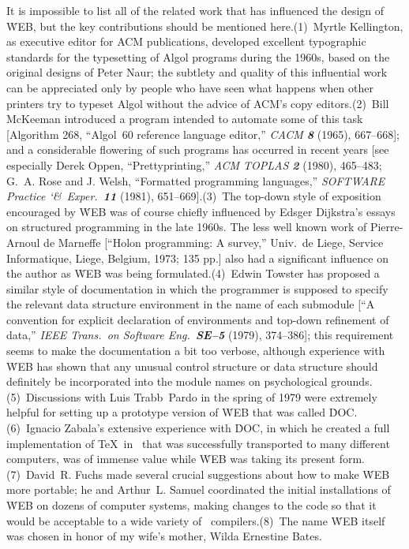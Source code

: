 It is impossible to list all of the related work that has influenced the
design of \.{WEB}, but the key contributions should be mentioned
here.\quad (1)~Myrtle Kellington, as executive editor for ACM
publications, developed excellent typographic standards for the
typesetting of Algol programs during the 1960s, based on the original
designs of Peter Naur; the subtlety and quality of this influential work
can be appreciated only by people who have seen what happens when other
printers try to typeset Algol without the advice of ACM's copy
editors.\quad(2)~Bill McKeeman introduced a program intended to automate
some of this task [Algorithm 268, ``Algol~60 reference language editor,''
{\sl CACM \bf8} (1965), 667--668]; and a considerable flowering of such
programs has occurred in recent years [see especially Derek Oppen,
``Prettyprinting,'' {\sl ACM TOPLAS \bf2} (1980), 465--483; G.~A. Rose and
J. Welsh, ``Formatted programming languages,'' {\sl SOFTWARE Practice
\char`\&\ Exper.\ \bf11} (1981), 651--669].\quad(3)~The top-down style of
exposition encouraged by \.{WEB} was of course chiefly influenced by Edsger
Dijkstra's essays on structured programming in the late 1960s. The less
well known work of Pierre-Arnoul de Marneffe [``Holon programming: A
survey,'' Univ.\ de Liege, Service Informatique, Liege, Belgium, 1973; 135
pp.\null] also had a significant influence on the author as \.{WEB} was
being formulated.\quad(4)~Edwin Towster has proposed a similar style of
documentation in which the programmer is supposed to specify the relevant
data structure environment in the name of each submodule [``A convention
for explicit declaration of environments and top-down refinement of
data,'' {\sl IEEE Trans.\ on Software Eng.\ \bf SE--5} (1979), 374--386];
this requirement seems to make the documentation a bit too verbose,
although experience with \.{WEB} has shown that any unusual control
structure or data structure should definitely be incorporated into the
module names on psychological grounds.\quad(5)~Discussions with Luis
Trabb~Pardo in the spring of 1979 were extremely helpful for setting up a
prototype version of \.{WEB} that was called \.{DOC}.\quad (6)~Ignacio
Zabala's extensive experience with \.{DOC}, in which he created a full
implementation of \TeX\ in \PASCAL\ that was successfully transported to
many different computers, was of immense value while \.{WEB} was taking
its present form.\quad(7)~David~R. Fuchs made several crucial suggestions
about how to make \.{WEB} more portable; he and Arthur~L. Samuel
coordinated the initial installations of \.{WEB} on dozens of computer
systems, making changes to the code so that it would be acceptable to
a wide variety of \PASCAL\ compilers.\quad(8)~The name \.{WEB} itself
was chosen in honor of my wife's mother, Wilda Ernestine Bates.

